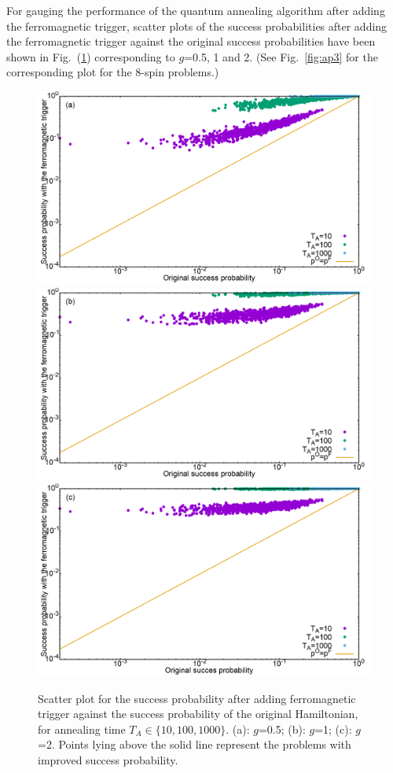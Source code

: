 \documentclass[../main.tex]{subfiles}
\begin{document}
For gauging the performance of the quantum annealing algorithm after adding the ferromagnetic trigger, scatter plots of the success probabilities after adding the ferromagnetic trigger against the original success probabilities have been shown in Fig.~(\ref{fig:f11}) corresponding to $g$=0.5, 1 and 2. (See Fig.~\ref{fig:ap3} for the corresponding plot for the 8-spin problems.)
\begin{figure}[H]
\centering 
\includegraphics[scale=0.24]{Scatt_s12_F_g0.png}
\includegraphics[scale=0.24]{Scatt_s12_F_g1.png}
\includegraphics[scale=0.24]{Scatt_s12_F_g2.png}
\caption{Scatter plot for the success probability after adding ferromagnetic trigger against the success probability of the original Hamiltonian, for annealing time $T_A \in \{10,100,1000\}$. (a): $g$=0.5; (b): $g$=1; (c): $g$=2. Points lying above the solid line represent the problems with improved success probability.}
\label{fig:f11}
\end{figure}
\end{document}
